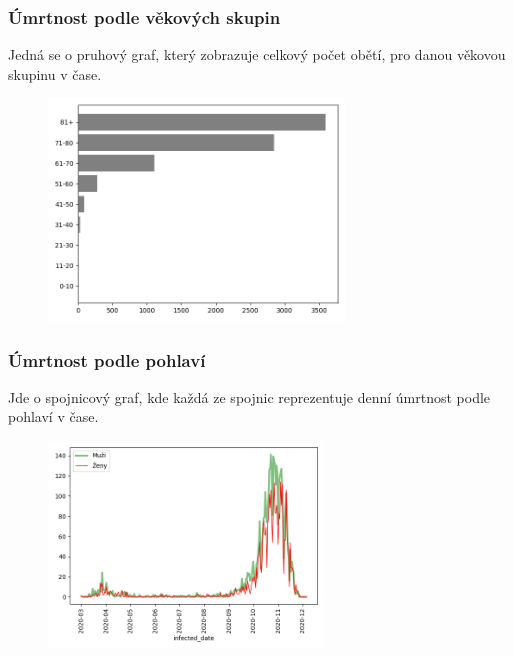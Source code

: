 \documentclass[11pt,a4paper,titlepage]{article}
\begin{document}
\subsubsection{Úmrtnost podle věkových skupin}
Jedná se o pruhový graf, který zobrazuje celkový počet obětí, pro danou věkovou skupinu v čase.
\begin{figure}[h]
    \centering
    \includegraphics[width=0.70\textwidth]{img/mortality_by_age.png}
    \label{fig:mortality_by_age}
\end{figure}

\newpage
\subsubsection{Úmrtnost podle pohlaví}
Jde o spojnicový graf, kde každá ze spojnic reprezentuje denní úmrtnost podle pohlaví v čase.
\begin{figure}[h]
    \centering
    \includegraphics[width=0.65\textwidth]{img/mortality_by_sex.png}
    \label{fig:mortality_by_sex}
\end{figure}
\end{document}
